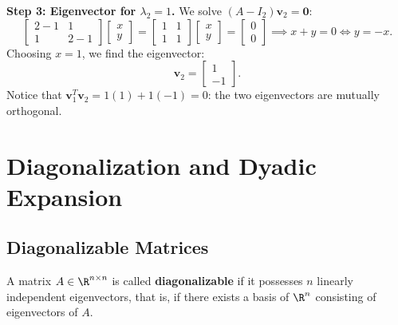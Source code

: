 \begin{example}
\noindent\textbf{Step 3: Eigenvector for $\lambda_2 = 1$.}
We solve $(A - I_2)\mathbf{v}_2 = \mathbf{0}$:
\begin{equation}
    \begin{bmatrix} 2-1 & 1 \\ 1 & 2-1 \end{bmatrix} \begin{bmatrix} x \\ y \end{bmatrix} = \begin{bmatrix} 1 & 1 \\ 1 & 1 \end{bmatrix} \begin{bmatrix} x \\ y \end{bmatrix} = \begin{bmatrix} 0 \\ 0 \end{bmatrix} \implies x + y = 0 \iff y = -x.
\end{equation}
Choosing $x = 1$, we find the eigenvector:
\begin{equation}
    \mathbf{v}_2 = \begin{bmatrix} 1 \\ -1 \end{bmatrix}.
\end{equation}
Notice that $\mathbf{v}_1^T \mathbf{v}_2 = 1(1) + 1(-1) = 0$: the two eigenvectors are mutually orthogonal.
\end{example}

\FloatBarrier
\section{Diagonalization and Dyadic Expansion}

\subsection{Diagonalizable Matrices}

\begin{definition}[Diagonalizability]
A matrix $A \in \R^{n \times n}$ is called \textbf{diagonalizable} if it possesses $n$ linearly independent eigenvectors, that is, if there exists a basis of $\R^n$ consisting of eigenvectors of $A$.
\end{definition}


